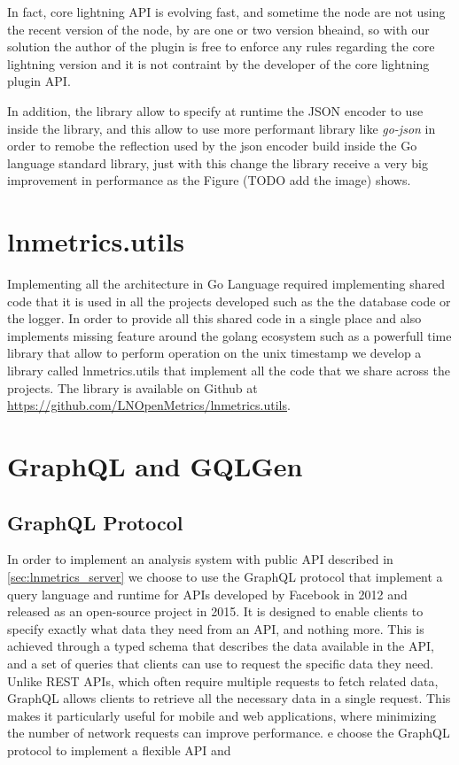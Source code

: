 In fact, core lightning API is evolving fast, and sometime the node are not using the 
recent version of the node, by are one or two version bheaind, so with our solution 
the author of the plugin is free to enforce any rules regarding the core lightning version 
and it is not contraint by the developer of the core lightning plugin API.

In addition, the library allow to specify at runtime the JSON encoder to use 
inside the library, and this allow to use more performant library like \emph{go-json}\cite{gojson}
in order to remobe the reflection used by the json encoder build inside the Go language
standard library, just with this change the library receive a very big improvement 
in performance as the Figure (TODO add the image) shows.

\section{lnmetrics.utils}

Implementing all the architecture in Go Language required implementing shared code 
that it is used in all the projects developed such as the the database code or the 
logger. In order to provide all this shared code in a single place and also implements 
missing feature around the golang ecosystem such as a powerfull time library that allow 
to perform operation on the unix timestamp we develop a library called lnmetrics.utils that
implement all the code that we share across the projects. 
The library is available on Github at \url{https://github.com/LNOpenMetrics/lnmetrics.utils}.

\section{GraphQL and GQLGen}

\subsection{GraphQL Protocol}

In order to implement an analysis system with public API described in \ref{sec:lnmetrics_server}
we choose to use the GraphQL protocol \cite{graphql} that implement  a query language and runtime for APIs 
developed by Facebook in 2012 and released as an open-source project in 2015. 
It is designed to enable clients to specify exactly what data they need from an API, 
and nothing more. This is achieved through a typed schema that describes the data 
available in the API, and a set of queries that clients can use to request the 
specific data they need.
Unlike REST APIs, which often require multiple requests to fetch related data, 
GraphQL allows clients to retrieve all the necessary data in a single request. 
This makes it particularly useful for mobile and web applications, where minimizing 
the number of network requests can improve performance.
e choose the GraphQL protocol to implement a flexible API and 

